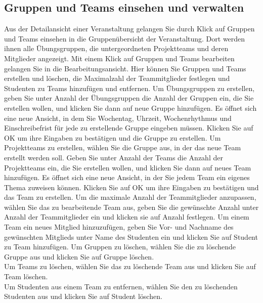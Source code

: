 \documentclass{Handbuch}
\begin{document}
\subsection{Gruppen und Teams einsehen und verwalten}
Aus der Detailansicht einer Veranstaltung gelangen Sie durch Klick auf \frqq Gruppen und Teams einsehen\flqq{} in die Gruppenübersicht der Veranstaltung. Dort werden ihnen alle Übungsgruppen, die untergeordneten Projektteams und deren Mitglieder angezeigt. Mit einem Klick auf \frqq Gruppen und Teams bearbeiten\flqq{} gelangen Sie in die Bearbeitungsansicht. 
Hier können Sie Gruppen und Teams erstellen und löschen, die Maximalzahl der Teammitglieder festlegen und Studenten zu Teams hinzufügen und entfernen.
Um Übungsgruppen zu erstellen, geben Sie unter \glqq Anzahl der Übungsgruppen\grqq{} die Anzahl der Gruppen ein, die Sie erstellen wollen, und klicken Sie dann auf \frqq neue Gruppe hinzufügen\flqq. Es öffnet sich eine neue Ansicht, in dem Sie Wochentag, Uhrzeit, Wochenrhythmus und Einschreibefrist für jede zu erstellende Gruppe eingeben müssen. Klicken Sie auf \frqq OK\flqq{} um ihre Eingaben zu bestätigen und die Gruppe zu erstellen. 
Um Projektteams zu erstellen, wählen Sie die Gruppe aus, in der das neue Team erstellt werden soll. Geben Sie unter \glqq Anzahl der Teams\grqq{} die Anzahl der Projektteams ein, die Sie erstellen wollen, und klicken Sie dann auf \frqq neues Team hinzufügen\flqq. Es öffnet sich eine neue Ansicht, in der Sie jedem Team ein eigenes Thema zuweisen können. Klicken Sie auf \frqq OK\flqq{} um ihre Eingaben zu bestätigen und das Team zu erstellen. 
Um die maximale Anzahl der Teammitglieder anzupassen, wählen Sie das zu bearbeitende Team aus, geben Sie die gewünschte Anzahl unter  \glqq Anzahl der Teammitglieder\grqq{} ein und klicken sie auf \frqq Anzahl festlegen\flqq.
Um einem Team ein neues Mitglied hinzuzufügen, geben Sie Vor- und Nachname des gewünschten Mitglieds unter \glqq Name des Studenten\grqq{} ein und klicken Sie auf \frqq Student zu Team hinzufügen\flqq.
Um Gruppen zu löschen, wählen Sie die zu löschende Gruppe aus und klicken Sie auf \frqq Gruppe löschen\flqq.\\
Um Teams zu löschen, wählen Sie das zu löschende Team aus und klicken Sie auf \frqq Team löschen\flqq.\\
Um Studenten aus einem Team zu entfernen, wählen Sie den zu löschenden Studenten aus und klicken Sie auf \frqq Student löschen\flqq.\\
\end{document}
